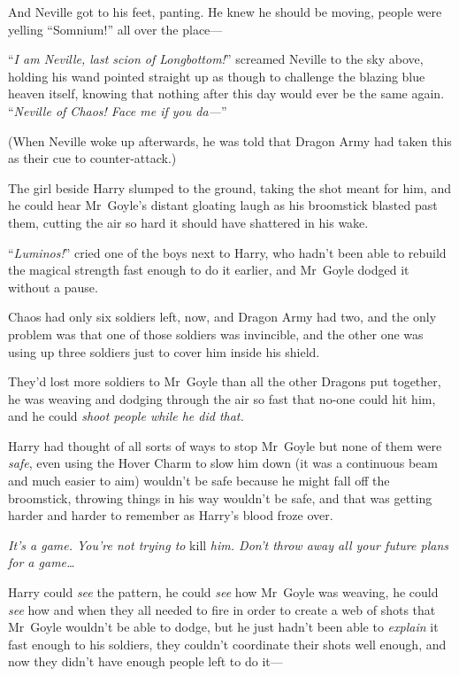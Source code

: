 And Neville got to his feet, panting. He knew he should be moving, people were yelling “Somnium!” all over the place—

“\emph{I am Neville, last scion of Longbottom!}” screamed Neville to the sky above, holding his wand pointed straight up as though to challenge the blazing blue heaven itself, knowing that nothing after this day would ever be the same again. “\emph{Neville of Chaos! Face me if you da—}”

(When Neville woke up afterwards, he was told that Dragon Army had taken this as their cue to counter-attack.)

\later

The girl beside Harry slumped to the ground, taking the shot meant for him, and he could hear Mr~Goyle’s distant gloating laugh as his broomstick blasted past them, cutting the air so hard it should have shattered in his wake.

“\emph{Luminos!}” cried one of the boys next to Harry, who hadn’t been able to rebuild the magical strength fast enough to do it earlier, and Mr~Goyle dodged it without a pause.

Chaos had only six soldiers left, now, and Dragon Army had two, and the only problem was that one of those soldiers was invincible, and the other one was using up three soldiers just to cover him inside his shield.

They’d lost more soldiers to Mr~Goyle than all the other Dragons put together, he was weaving and dodging through the air so fast that no-one could hit him, and he could \emph{shoot people while he did that.}

Harry had thought of all sorts of ways to stop Mr~Goyle but none of them were \emph{safe}, even using the Hover Charm to slow him down (it was a continuous beam and much easier to aim) wouldn’t be safe because he might fall off the broomstick, throwing things in his way wouldn’t be safe, and that was getting harder and harder to remember as Harry’s blood froze over.

\emph{It’s a game. You’re not trying to} kill \emph{him. Don’t throw away all your future plans for a game…}

Harry could \emph{see} the pattern, he could \emph{see} how Mr~Goyle was weaving, he could \emph{see} how and when they all needed to fire in order to create a web of shots that Mr~Goyle wouldn’t be able to dodge, but he just hadn’t been able to \emph{explain} it fast enough to his soldiers, they couldn’t coordinate their shots well enough, and now they didn’t have enough people left to do it—

